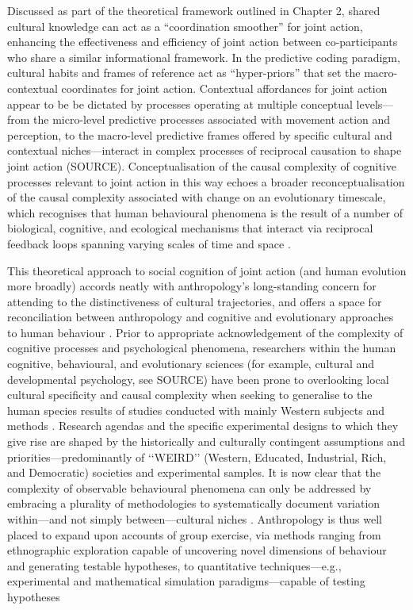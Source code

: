 Discussed as part of the theoretical framework outlined in Chapter 2, shared cultural knowledge can act as a ``coordination smoother'' \citep{Vesper2017} for joint action, enhancing the effectiveness and efficiency of joint action between co-participants who share a similar informational framework.  In the predictive coding paradigm, cultural habits and frames of reference act as ``hyper-priors'' that set the macro-contextual coordinates for joint action\citep{Clark2013}.  Contextual affordances for joint action appear to be be dictated by processes operating at multiple conceptual levels---from the micro-level predictive processes associated with movement action and perception, to the macro-level predictive frames offered by specific cultural and contextual niches---interact in complex processes of reciprocal causation to shape joint action (SOURCE).  Conceptualisation of the causal complexity of cognitive processes relevant to joint action in this way echoes a broader reconceptualisation of the causal complexity associated with change on an evolutionary timescale, which recognises that human behavioural phenomena is the result of a number of biological, cognitive, and ecological mechanisms that interact via reciprocal feedback loops spanning varying scales of time and space \citep{Fuentes2015}.


This theoretical approach to social cognition of joint action (and human evolution more broadly) accords neatly with anthropology's long-standing concern for attending to the distinctiveness of cultural trajectories, and offers a space for reconciliation between anthropology and cognitive and evolutionary approaches to human behaviour \citep{Whitehouse2012}.  Prior to appropriate acknowledgement of the complexity of cognitive processes and psychological phenomena, researchers within the human cognitive, behavioural, and evolutionary sciences (for example, cultural and developmental psychology, see SOURCE) have been prone to overlooking local cultural specificity and causal complexity when seeking to generalise to the human species results of studies conducted with mainly Western subjects and methods \citep{Henrich2010d}.  Research agendas and the specific experimental designs to which they give rise are shaped by the historically and culturally contingent assumptions and priorities---predominantly of ‘‘WEIRD’’ (Western, Educated, Industrial, Rich, and Democratic) societies and experimental samples.  It is now clear that the complexity of observable behavioural phenomena can only be addressed by embracing a plurality of methodologies to systematically document variation within---and not simply between---cultural niches \citep{Fuentes2016}.  Anthropology is thus well placed to expand upon accounts of group exercise, via methods ranging from ethnographic exploration capable of uncovering novel dimensions of behaviour and generating testable hypotheses, to quantitative techniques---e.g., experimental and mathematical simulation paradigms---capable of testing hypotheses

